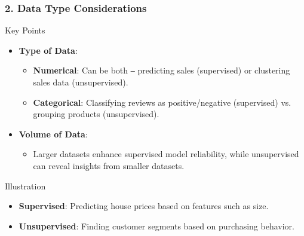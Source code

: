 \documentclass[aspectratio=169]{beamer}
\begin{document}
\begin{frame}[fragile]
    \frametitle{2. Data Type Considerations}
    \begin{block}{Key Points}
        \begin{itemize}
            \item \textbf{Type of Data}:
                \begin{itemize}
                    \item \textbf{Numerical}: Can be both ‒ predicting sales (supervised) or clustering sales data (unsupervised).
                    \item \textbf{Categorical}: Classifying reviews as positive/negative (supervised) vs. grouping products (unsupervised).
                \end{itemize}
            \item \textbf{Volume of Data}:
                \begin{itemize}
                    \item Larger datasets enhance supervised model reliability, while unsupervised can reveal insights from smaller datasets.
                \end{itemize}
        \end{itemize}
    \end{block}

    \begin{block}{Illustration}
        \begin{itemize}
            \item \textbf{Supervised}: Predicting house prices based on features such as size.
            \item \textbf{Unsupervised}: Finding customer segments based on purchasing behavior.
        \end{itemize}
    \end{block}
\end{frame}
\end{document}

